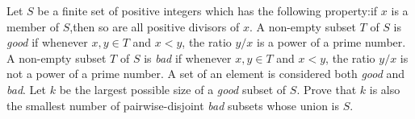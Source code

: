 Let $S$ be a finite set of positive integers which has the following property:if $x$ is a member of $S$,then so are all positive divisors of $x$. A non-empty subset $T$ of $S$ is \textit{good} if whenever $x,y\in T$ and $x<y$, the ratio $y/x$ is a power of a prime number. A non-empty subset $T$ of $S$ is \textit{bad} if whenever $x,y\in T$ and $x<y$, the ratio $y/x$ is not a power of a prime number. A set of an element is considered both \textit{good} and \textit{bad}. Let $k$ be the largest possible size of a \textit{good} subset of $S$. Prove that $k$ is also the smallest number of pairwise-disjoint \textit{bad} subsets whose union is $S$.